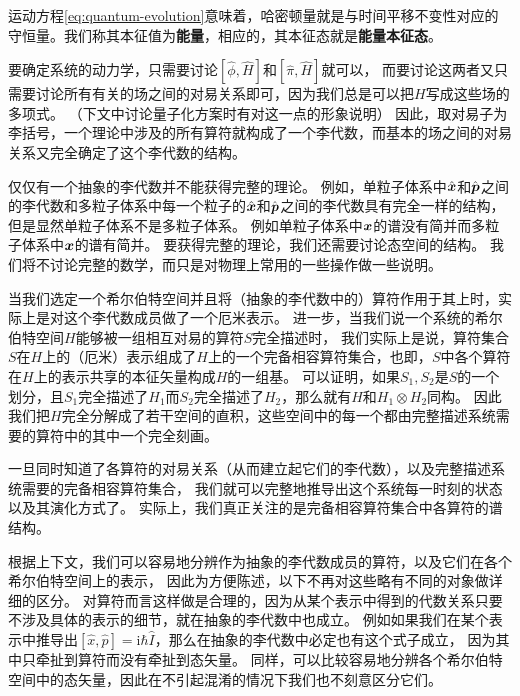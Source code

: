 \documentclass[UTF8, a4paper]{ctexart}
\newcommand*{\ii}{\mathrm{i}}
\begin{document}
运动方程\eqref{eq:quantum-evolution}意味着，哈密顿量就是与时间平移不变性对应的守恒量。我们称其本征值为\textbf{能量}，相应的，其本征态就是\textbf{能量本征态}。

要确定系统的动力学，只需要讨论$[\hat{\phi}, \hat{H}]$和$[\hat{\pi}, \hat{H}]$就可以，
而要讨论这两者又只需要讨论所有有关的场之间的对易关系即可，因为我们总是可以把$H$写成这些场的多项式。
（下文中讨论量子化方案时有对这一点的形象说明）
因此，取对易子为李括号，一个理论中涉及的所有算符就构成了一个李代数，而基本的场之间的对易关系又完全确定了这个李代数的结构。

仅仅有一个抽象的李代数并不能获得完整的理论。
例如，单粒子体系中$\hat{\vb*{x}}$和$\hat{\vb*{p}}$之间的李代数和多粒子体系中每一个粒子的$\hat{\vb*{x}}$和$\hat{\vb*{p}}$之间的李代数具有完全一样的结构，但是显然单粒子体系不是多粒子体系。
例如单粒子体系中$\vb*{x}$的谱没有简并而多粒子体系中$\vb*{x}$的谱有简并。
要获得完整的理论，我们还需要讨论态空间的结构。
我们将不讨论完整的数学，而只是对物理上常用的一些操作做一些说明。

当我们选定一个希尔伯特空间并且将（抽象的李代数中的）算符作用于其上时，实际上是对这个李代数成员做了一个厄米表示。
进一步，当我们说一个系统的希尔伯特空间$H$能够被一组相互对易的算符$S$完全描述时，
我们实际上是说，算符集合$S$在$H$上的（厄米）表示组成了$H$上的一个完备相容算符集合，也即，$S$中各个算符在$H$上的表示共享的本征矢量构成$H$的一组基。
可以证明，如果$S_1,S_2$是$S$的一个划分，且$S_1$完全描述了$H_1$而$S_2$完全描述了$H_2$，那么就有$H$和$H_1 \otimes H_2$同构。
因此我们把$H$完全分解成了若干空间的直积，这些空间中的每一个都由完整描述系统需要的算符中的其中一个完全刻画。

一旦同时知道了各算符的对易关系（从而建立起它们的李代数），以及完整描述系统需要的完备相容算符集合，
我们就可以完整地推导出这个系统每一时刻的状态以及其演化方式了。
实际上，我们真正关注的是完备相容算符集合中各算符的谱结构。

根据上下文，我们可以容易地分辨作为抽象的李代数成员的算符，以及它们在各个希尔伯特空间上的表示，
因此为方便陈述，以下不再对这些略有不同的对象做详细的区分。
对算符而言这样做是合理的，因为从某个表示中得到的代数关系只要不涉及具体的表示的细节，就在抽象的李代数中也成立。
例如如果我们在某个表示中推导出$[\hat{x}, \hat{p}] = \ii \hbar \hat{I}$，那么在抽象的李代数中必定也有这个式子成立，
因为其中只牵扯到算符而没有牵扯到态矢量。
同样，可以比较容易地分辨各个希尔伯特空间中的态矢量，因此在不引起混淆的情况下我们也不刻意区分它们。
\end{document}
